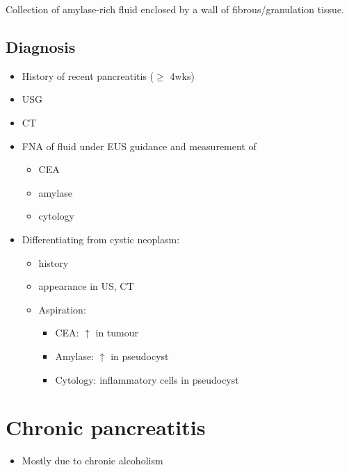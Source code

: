 \documentclass[
  12pt,
]{memoir}
\providecommand{\tightlist}{%
  \setlength{\itemsep}{0pt}\setlength{\parskip}{0pt}}
\begin{document}
Collection of amylase-rich fluid enclosed by a wall of
fibrous/granulation tissue.

\hypertarget{diagnosis}{%
\subsection{Diagnosis}\label{diagnosis}}

\begin{itemize}
\tightlist
\item
  History of recent pancreatitis (\(\ge\) 4wks)
\item
  USG
\item
  CT
\item
  FNA of fluid under EUS guidance and measurement of

  \begin{itemize}
  \tightlist
  \item
    CEA
  \item
    amylase
  \item
    cytology
  \end{itemize}
\item
  Differentiating from cystic neoplasm:

  \begin{itemize}
  \tightlist
  \item
    history
  \item
    appearance in US, CT
  \item
    Aspiration:

    \begin{itemize}
    \tightlist
    \item
      CEA: \(\uparrow\) in tumour
    \item
      Amylase: \(\uparrow\) in pseudocyst
    \item
      Cytology: inflammatory cells in pseudocyst
    \end{itemize}
  \end{itemize}
\end{itemize}

\hypertarget{chronic-pancreatitis}{%
\section{Chronic pancreatitis}\label{chronic-pancreatitis}}

\begin{itemize}
\tightlist
\item
  Mostly due to chronic alcoholism
\end{itemize}
\end{document}

